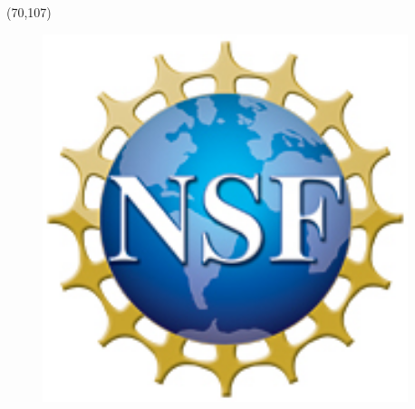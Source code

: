 \documentclass[final]{beamer}
\begin{document}
\begin{frame}{}
\begin{textblock}{8.0}(70,107)
\begin{figure}[tbph]
\centering
\includegraphics[width=0.95\textwidth]{images/nsf1.jpg}
\end{figure}
\end{textblock}


\end{frame}
\end{document}
